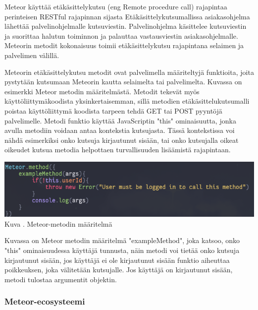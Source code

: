 


Meteor käyttää etäkäsittelykutsu (eng Remote procedure call) rajapintaa perinteisen RESTful rajapinnan sijasta
Etäkäsittelykutsumallissa asiakasohjelma lähettää palvelinohjelmalle kutsuviestin.
Palvelinohjelma käsittelee kutsuviestin ja suorittaa halutun toiminnon ja palauttaa vastausviestin asiakasohjelmalle.
Meteorin metodit kokonaisuus toimii etäkäsittelykutsu rajapintana selaimen ja palvelimen välillä. 
\medskip



Meteorin etäkäsittelykutsu metodit ovat palvelimella määriteltyjä funktioita, joita pystytään kutsumaan Meteorin kautta selaimelta tai palvelimelta. 
Kuvassa \nextImageCount{} on esimerkki Meteor metodin määritelmästä.
Metodit tekevät myös käyttöliittymäkoodista yksinkertaisemman, 
sillä metodien etäkäsittelukutsumalli poistaa käyttöliittymä koodista tarpeen tehdä GET tai POST pyyntöjä palvelimelle.
Metodi funktio käyttää JavaScriptin "this"{} ominaisuutta, jonka
avulla metodiin voidaan antaa kontekstia kutsujasta.
Tässä kontekstissa voi nähdä esimerkiksi onko kutsuja kirjautunut sisään, tai onko kutsujalla oikeat oikeudet kutsua metodia helpottaen turvallisuuden lisäämistä rajapintaan.
\bigskip

\includegraphics[width=15cm]{src/public/methodexample.png}\\
Kuva \getImgCount {}. Meteor-metodin määritelmä
\medskip

Kuvassa on Meteor metodin määritelmä "exampleMethod"{}, joka katsoo, onko "this"{} ominaisuudessa käyttäjä tunnusta, 
näin metodi voi tietää onko kutsuja kirjautunut sisään,
jos käyttäjä ei ole kirjautunut sisään funktio aiheuttaa poikkeuksen, joka välitetään kutsujalle.
Jos käyttäjä on kirjautunut sisään, metodi tulostaa argumentit objektin. 
\medskip




\subsubsection{Meteor-ecosysteemi}

